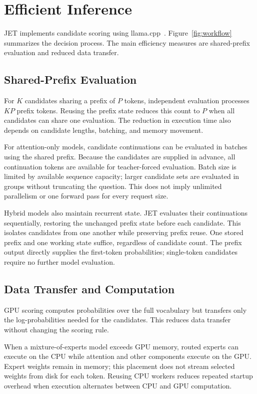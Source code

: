 \section{Efficient Inference}
\label{sec:implementation}

JET implements candidate scoring using llama.cpp~\cite{llamacpp}.
Figure~\ref{fig:workflow} summarizes the decision process. The main efficiency
measures are shared-prefix evaluation and reduced data transfer.

\subsection{Shared-Prefix Evaluation}
For $K$ candidates sharing a prefix of $P$ tokens, independent evaluation
processes $KP$ prefix tokens. Reusing the prefix state reduces this count to
$P$ when all candidates can share one evaluation. The reduction in execution
time also depends on candidate lengths, batching, and memory movement.

For attention-only models, candidate continuations can be evaluated in
batches using the shared prefix. Because the candidates are supplied in
advance, all continuation tokens are available for teacher-forced evaluation.
Batch size is limited by available sequence capacity; larger candidate sets
are evaluated in groups without truncating the question. This does not imply
unlimited parallelism or one forward pass for every request size.

Hybrid models also maintain recurrent state. JET evaluates their continuations
sequentially, restoring the unchanged prefix state before each candidate.
This isolates candidates from one another while preserving prefix reuse.
One stored prefix and one working state suffice, regardless of candidate count.
The prefix output directly supplies the first-token probabilities; single-token
candidates require no further model evaluation.

\subsection{Data Transfer and Computation}
GPU scoring computes probabilities over the full vocabulary but transfers only
the log-probabilities needed for the candidates. This reduces data transfer
without changing the scoring rule.

When a mixture-of-experts model exceeds GPU memory, routed experts can execute
on the CPU while attention and other components execute on the GPU.
Expert weights remain in memory; this placement does not stream selected
weights from disk for each token. Reusing CPU workers reduces repeated startup
overhead when execution alternates between CPU and GPU computation.


